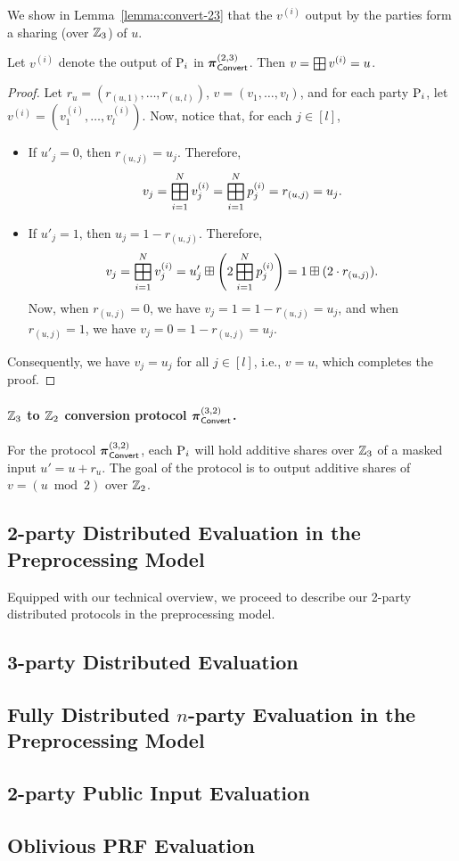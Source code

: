 \noindent We show in Lemma~\ref{lemma:convert-23} that the $v^{(i)}$ output by the parties form a sharing (over $\mathbb{Z}_3$) of $u$.

\begin{lemma}
Let $v^{(i)}$ denote the output of $\textnormal{P}_i$ in $\boldsymbol{\pi}_{\textsf{Convert}}^{(2,3)}$. Then $v = \bigboxplus v^{(i)} = u$.
\label{lemma:convert-23}
\end{lemma}
\begin{proof}
Let $r_u = (r_{(u,1)}, \dots, r_{(u,l)})$, $v = (v_1, \dots, v_l)$, and for each party $\textnormal{P}_i$, let $v^{(i)} = (v^{(i)}_1, \dots, v^{(i)}_l)$. Now, notice that, for each $j \in [l]$,
\begin{itemize}
    \item If $u'_j = 0$, then $r_{(u,j)} = u_j$. Therefore,
    \[
     v_j = \bigboxplus_{i=1}^N v^{(i)}_j = \bigboxplus_{i=1}^N p^{(i)}_j = r_{(u,j)} = u_j.
    \]
    \item If $u'_j = 1$, then $u_j = 1 - r_{(u,j)}$. Therefore,
    \[
    v_j = \bigboxplus_{i=1}^N v^{(i)}_j = u'_j \boxplus \left(2\bigboxplus_{i=1}^N p^{(i)}_j \right) = 1 \boxplus (2 \cdot r_{(u,j)}).
    \]
    \noindent Now, when $r_{(u,j)} = 0$, we have $v_j = 1 = 1 - r_{(u,j)} = u_j$, and when $r_{(u,j)} = 1$, we have $v_j = 0 = 1 - r_{(u,j)} = u_j$.
\end{itemize}
Consequently, we have $v_j = u_j$ for all $j \in [l]$, i.e., $v = u$, which completes the proof.
\end{proof}

\paragraph{$\mathbb{Z}_3$ to $\mathbb{Z}_2$ conversion protocol $\boldsymbol{\pi}_{\textsf{Convert}}^{(3,2)}$.}
For the protocol $\boldsymbol{\pi}_{\textsf{Convert}}^{(3,2)}$, each $\textnormal{P}_i$ will hold additive shares over $\mathbb{Z}_3$ of a masked input $u' = u + r_u$. The goal of the protocol is to output additive shares of $v = (u \bmod 2)$ over $\mathbb{Z}_2$.


\subsection{2-party Distributed Evaluation in the Preprocessing Model}
Equipped with our technical overview, we proceed to describe our 2-party distributed protocols in the preprocessing model. 

\subsection{3-party Distributed Evaluation}

\subsection{Fully Distributed $n$-party Evaluation in the Preprocessing Model}

\subsection{2-party Public Input Evaluation}

\subsection{Oblivious PRF Evaluation}

